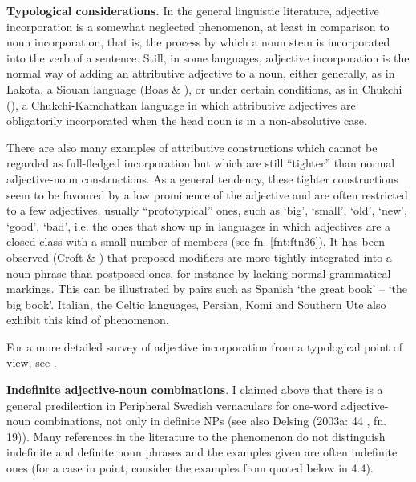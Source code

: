 
\textbf{Typological considerations.} In the general linguistic literature, adjective incorporation is a somewhat neglected phenomenon, at least in comparison to noun incorporation, that is, the process by which a noun stem is incorporated into the verb of a sentence. Still, in some languages, adjective incorporation is the normal way of adding an attributive adjective to a noun, either generally, as in Lakota, a Siouan language (Boas \& \citet{Deloria1941}), or under certain conditions, as in Chukchi (\citet[526]{Muravyova1998}), a Chukchi-Kamchatkan language in which attributive adjectives are obligatorily incorporated when the head noun is in a non-absolutive case.


There are also many examples of attributive constructions which cannot be regarded as full-fledged incorporation but which are still “tighter” than normal adjective-noun constructions. As a general tendency, these tighter constructions seem to be favoured by a low prominence of the adjective and are often restricted to a few adjectives, usually “prototypical” ones, such as ‘big’, ‘small’, ‘old’, ‘new’, ‘good’, ‘bad’, i.e. the ones that show up in languages in which adjectives are a closed class with a small number of members (see fn. \ref{fnt:ftn36}). It has been observed (Croft \& \citet{Deligianni2001}) that preposed modifiers are more tightly integrated into a noun phrase than postposed ones, for instance by lacking normal grammatical markings. This can be illustrated by pairs such as Spanish ‘the great book’ –  ‘the big book’. Italian, the Celtic languages, Persian, Komi and Southern Ute also exhibit this kind of phenomenon. 


For a more detailed survey of adjective incorporation from a typological point of view, see \citet[225-236]{Dahl2004}.


\textbf{Indefinite adjective-noun combinations}. I claimed above that there is a general predilection in Peripheral Swedish vernaculars for one-word adjective-noun combinations, not only in definite NPs (see also Delsing (2003a: 44 , fn. 19)). Many references in the literature to the phenomenon do not distinguish indefinite and definite noun phrases and the examples given are often indefinite ones (for a case in point, consider the examples from \citet{Hedblom1978} quoted below in 4.4). 


